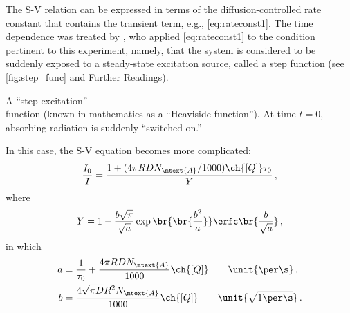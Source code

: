The S-V relation can be expressed in terms of the diffusion-controlled rate constant that contains the transient term, e.g., \cref{eq:rateconst1}. 
The time dependence was treated by \textcite{ware66}, who applied \cref{eq:rateconst1} to the condition pertinent to this experiment, namely, that the system is considered to be suddenly exposed to a steady-state excitation source, called a step function (see \cref{fig:step_func} and Further Readings). %
\begin{marginfigure}
	\centering
	\caption{A ``step excitation''\\ function (known in mathematics as a ``Heaviside function''). At time \( {t = 0} \), absorbing radiation is suddenly ``switched on.''}
	\label{fig:step_func}
\end{marginfigure}%
In this case, the S-V equation becomes more complicated:
\begin{equation}
	\frac{I_0}{I} = \frac{1 + (4 \pi R D N_\mtext{A} / 1000) \ch{[Q]} \tau_0}{Y} \, ,
	\label{eq:sv_step_rel}
\end{equation}
where
\begin{equation}
	Y = 1 - \frac{b \sqrt{\pi}}{\sqrt{a}} \exp\br{\br{ \frac{b^2}{a} }} \erfc\br{ \frac{b}{\sqrt{a}} } \, ,
	\label{eq:sv_y}
\end{equation}
in which 
\begin{align*}
	a &= \frac{1}{\tau_0} + \frac{4 \pi R D N_\mtext{A}}{1000} \ch{[Q]} \qquad \unit{\per\s} \, ,\\
	b &= \frac{4 \sqrt{\pi D} R^2 N_\mtext{A}}{1000} \ch{[Q]} \qquad \unit{\sqrt{1\per\s}}\, .
\end{align*}
